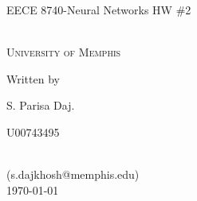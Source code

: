 \documentclass[12pt,oneside,geqno]{article}
\begin{document}
	
	\begin{center}
		{\LARGE EECE 8740-Neural Networks HW \#2}%
		\vspace*{1\baselineskip}   
		
		\scshape %
		\color{red}{(Solutions)}\\
		\vspace*{1\baselineskip}
		\color{black}University of Memphis\\[\baselineskip]
		\vspace*{5\baselineskip} 
		
		Written by \\[\baselineskip]
		{\Large S. Parisa Daj.\par U00743495} \\
		(s.dajkhosh@memphis.edu)\\
		
		\vspace*{1\baselineskip}
		\today
	\end{center}
	\clearpage
	
\end{document}
